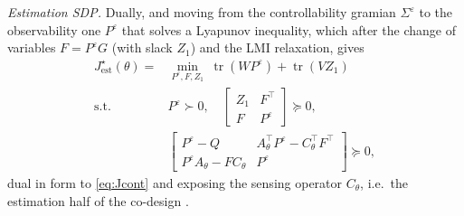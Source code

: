 \documentclass[twocolumn,amsthm]{autart}
\begin{document}
\emph{Estimation SDP.} Dually, and moving from the controllability gramian $\Sigma^\varepsilon$ to the observability one $P^\varepsilon$ that solves a
Lyapunov inequality, which after the change of variables $F = P^\varepsilon G$
(with slack $Z_1$) and the LMI relaxation, gives
\begin{equation}\label{eq:Jest}
\begin{aligned}
J_{\mathrm{est}}^\star(\theta) = &\min_{P^\varepsilon,F,Z_1}\
\operatorname{tr}(W P^\varepsilon) + \operatorname{tr}(V Z_1)\\
\text{s.t. } & P^\varepsilon \succ 0, \quad
\begin{bmatrix} Z_1 & F^\top \\ F & P^\varepsilon \end{bmatrix}
 \succeq 0,\\
& \begin{bmatrix}
P^\varepsilon - Q & A_\theta^\top P^\varepsilon - C_\theta^\top F^\top \\
P^\varepsilon A_\theta - F C_\theta & P^\varepsilon
\end{bmatrix} \succeq 0,
\end{aligned}
\end{equation}
dual in form to \eqref{eq:Jcont} and exposing the sensing operator $C_\theta$,
i.e.\ the estimation half of the co-design \cite{li2008integrating}.
\end{document}
